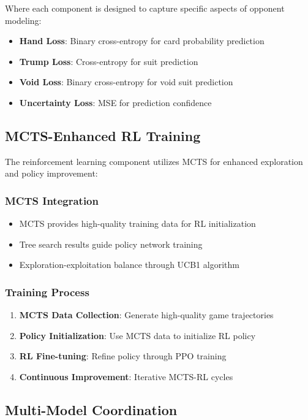 \documentclass[conference]{IEEEtran}
\begin{document}
Where each component is designed to capture specific aspects of opponent modeling:
\begin{itemize}
    \item \textbf{Hand Loss}: Binary cross-entropy for card probability prediction
    \item \textbf{Trump Loss}: Cross-entropy for suit prediction
    \item \textbf{Void Loss}: Binary cross-entropy for void suit prediction
    \item \textbf{Uncertainty Loss}: MSE for prediction confidence
\end{itemize}

\subsection{MCTS-Enhanced RL Training}

The reinforcement learning component utilizes MCTS for enhanced exploration and policy improvement:

\subsubsection{MCTS Integration}
\begin{itemize}
    \item MCTS provides high-quality training data for RL initialization
    \item Tree search results guide policy network training
    \item Exploration-exploitation balance through UCB1 algorithm
\end{itemize}

\subsubsection{Training Process}
\begin{enumerate}
    \item \textbf{MCTS Data Collection}: Generate high-quality game trajectories
    \item \textbf{Policy Initialization}: Use MCTS data to initialize RL policy
    \item \textbf{RL Fine-tuning}: Refine policy through PPO training
    \item \textbf{Continuous Improvement}: Iterative MCTS-RL cycles
\end{enumerate}

\subsection{Multi-Model Coordination}
\end{document}
